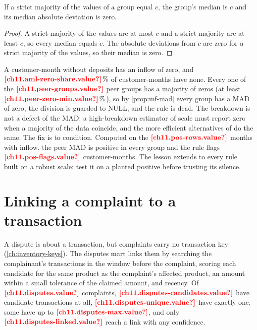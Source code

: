 \begin{proposition}\label{prop:mf-mad}
If a strict majority of the values of a group equal $c$, the group's median is $c$ and its median absolute deviation is zero.
\end{proposition}

\begin{proof}
A strict majority of the values are at most $c$ and a strict majority are at least $c$, so every median equals $c$. The
absolute deviations from $c$ are zero for a strict majority of the values, so their median is zero.
\end{proof}

A customer-month without deposits has an inflow of zero, and $\est{ch11.aml-zero-share}{value}\,\%$ of customer-months have
none. Every one of the $\est{ch11.peer-groups}{value}$ peer groups has a majority of zeros (at least
$\est{ch11.peer-zero-min}{value}\,\%$), so by \cref{prop:mf-mad} every group has a MAD of zero, the division is guarded to
NULL, and the rule is dead. The breakdown is not a defect of the MAD: a high-breakdown estimator of scale must report zero
when a majority of the data coincide, and the more efficient alternatives of \textcite{rousseeuw1993} do the same. The fix
is to condition. Computed on the $\est{ch11.pos-rows}{value}$ months with inflow, the peer MAD is positive in every group and
the rule flags $\est{ch11.pos-flags}{value}$ customer-months. The lesson extends to every rule built on a robust scale: test
it on a planted positive before trusting its silence.

\section{Linking a complaint to a transaction}\label{sec:mf-disputes}

A dispute is about a transaction, but complaints carry no transaction key (\cref{ch:inventory-keys}). The disputes mart
links them by searching the complainant's transactions in the window before the complaint, scoring each candidate for
the same product as the complaint's affected product, an amount within a small tolerance of the claimed amount, and
recency. Of $\est{ch11.disputes}{value}$ complaints, $\est{ch11.disputes-candidates}{value}$ have candidate
transactions at all, $\est{ch11.disputes-unique}{value}$ have exactly one, some have up to
$\est{ch11.disputes-max}{value}$, and only $\est{ch11.disputes-linked}{value}$ reach a link with any confidence.

